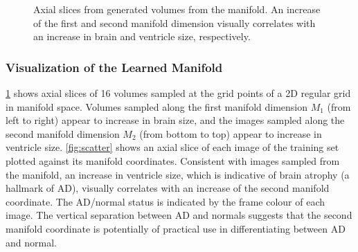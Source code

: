 \begin{figure}[tb!]
\centering
  

\caption[Axial slices from generated volumes from the manifold]{Axial slices
from generated volumes from the manifold. An increase of the first and second manifold dimension visually correlates with an increase in
brain and ventricle size, respectively.}
\label{fig:generated}
\end{figure}

\subsubsection{Visualization of the Learned Manifold}

\ref{fig:generated} shows axial slices of 16 volumes sampled at the grid points
of a 2D regular grid in manifold space. Volumes sampled along the first manifold
dimension $M_1$ (from left to right) appear to increase in brain size, and the
images sampled along the second manifold dimension $M_2$ (from bottom to top)
appear to increase in ventricle size. \ref{fig:scatter} shows an axial slice of
each image of the training set plotted against its manifold coordinates.
Consistent with images sampled from the manifold, an increase in ventricle size,
which is indicative of brain atrophy (a hallmark of AD), visually correlates
with an increase of the second manifold coordinate. The AD/normal status is
indicated by the frame colour of each image. The vertical separation between AD
and normals suggests that the second manifold coordinate is potentially of
practical use in differentiating between AD and normal.

